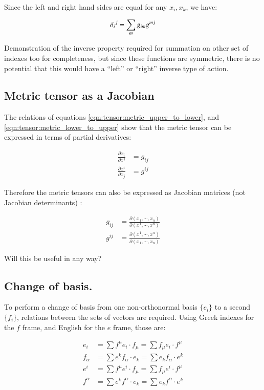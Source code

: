 Since the left and right hand sides are equal for any $x_i, x_k$, we have:

\begin{equation}
{\delta_{i}}^j = \sum_m g_{im} g^{mj} \\
\end{equation}

Demonstration of the inverse property required for summation on other set of indexes too for completeness, but since these functions are symmetric, there 
is no potential that this would have a ``left'' or ``right'' inverse type of action.

\subsection{Metric tensor as a Jacobian }

The relations of equations \ref{eqn:tensor:metric_upper_to_lower}, and \ref{eqn:tensor:metric_lower_to_upper} show that the metric tensor can be expressed in terms of partial derivatives:

\begin{align}
\frac{\partial x_i }{\partial x^j } &= g_{ij} \\
\frac{\partial x^i }{\partial x_j } &= g^{ij}
\end{align}

Therefore the metric tensors can also be expressed as Jacobian matrices (not Jacobian determinants) :

\begin{align}
g_{ij} &= \frac{\partial (x_1, \cdots, x_n) }{\partial (x^1, \cdots, x^n) } \\
g^{ij} &= \frac{\partial (x^1, \cdots, x^n) }{\partial (x_1, \cdots, x_n) }
\end{align}

Will this be useful in any way?

\subsection{Change of basis. }

To perform a change of basis from one non-orthonormal basis $\{e_i\}$ to a second $\{f_i\}$, relations between the sets of vectors
are required.  Using Greek indexes for the $f$ frame, and English for the $e$ frame, those are:

\begin{align*}
e_i 		&= \sum f^{\mu} e_i \cdot f_{\mu} 	= \sum f_{\mu} e_i \cdot f^{\mu} \\
f_{\alpha} 	&= \sum e^k f_{\alpha} \cdot e_k 	= \sum e_k f_{\alpha} \cdot e^k \\
e^i 		&= \sum f^{\mu} e^i \cdot f_{\mu} 	= \sum f_{\mu} e^i \cdot f^{\mu} \\
f^{\alpha} 	&= \sum e^k f^{\alpha} \cdot e_k 	= \sum e_k f^{\alpha} \cdot e^k 
\end{align*}


